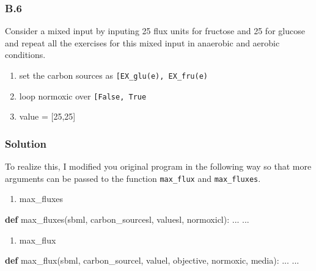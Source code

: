 \documentclass[]{article}
\newenvironment{Shaded}{}{}
\newcommand{\KeywordTok}[1]{\textcolor[rgb]{0.00,0.44,0.13}{\textbf{#1}}}
\newcommand{\NormalTok}[1]{#1}
\begin{document}
\hypertarget{header-n224}{%
\subsubsection{B.6}\label{header-n224}}

Consider a mixed input by inputing 25 flux units for fructose and 25 for
glucose and repeat all the exercises for this mixed input in anaerobic
and aerobic conditions.

\begin{enumerate}
\def\labelenumi{\arabic{enumi}.}
\item
  set the carbon sources as
  \texttt{{[}\textquotesingle{}EX\_glu(e)\textquotesingle{},\ \textquotesingle{}EX\_fru(e)\textquotesingle{}{]}}
\item
  loop normoxic over \texttt{{[}False,\ True\textquotesingle{}{]}}
\item
  value = {[}25,25{]}
\end{enumerate}

\hypertarget{header-n239}{%
\subsubsection{Solution}\label{header-n239}}

To realize this, I modified you original program in the following way so
that more arguments can be passed to the function \texttt{max\_flux} and
\texttt{max\_fluxes}.

\begin{enumerate}
\def\labelenumi{\arabic{enumi}.}
\item
  max\_fluxes
\end{enumerate}

\begin{Shaded}
\begin{Highlighting}[]
\KeywordTok{def}\NormalTok{ max_fluxes(sbml, carbon_sourcesl, valuesl, normoxicl):}
\NormalTok{    ...}
\NormalTok{    ...}
\end{Highlighting}
\end{Shaded}

\begin{enumerate}
\def\labelenumi{\arabic{enumi}.}
\item
  max\_flux
\end{enumerate}

\begin{Shaded}
\begin{Highlighting}[]
\KeywordTok{def}\NormalTok{ max_flux(sbml, carbon_sourcel, valuel, objective, normoxic, media):}
\NormalTok{    ...}
\NormalTok{    ...}
\end{Highlighting}
\end{Shaded}
\end{document}
